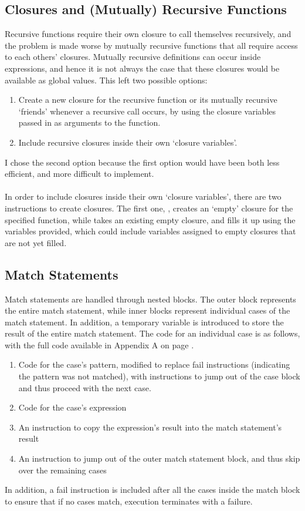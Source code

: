 \subsection{Closures and (Mutually) Recursive Functions}
Recursive functions require their own closure to call themselves recursively, and the problem is made worse by mutually recursive functions that all require access to each others' closures. Mutually recursive definitions can occur inside expressions, and hence it is not always the case that these closures would be available as global values. This left two possible options:
\begin{enumerate}
\item Create a new closure for the recursive function or its mutually recursive `friends' whenever a recursive call occurs, by using the closure variables passed in as arguments to the function.
\item Include recursive closures inside their own `closure variables'.
\end{enumerate}
I chose the second option because the first option would have been both less efficient, and more difficult to implement.
\\\\
In order to include closures inside their own `closure variables', there are two instructions to create closures. The first one, , creates an `empty' closure for the specified function, while  takes an existing empty closure, and fills it up using the variables provided, which could include variables assigned to empty closures that are not yet filled.

\subsection{Match Statements}
Match statements are handled through nested blocks. The outer block represents the entire match statement, while inner blocks represent individual cases of the match statement. In addition, a temporary variable is introduced to store the result of the entire match statement. The code for an individual case is as follows, with the full code available in Appendix A on page \pageref{sample:transformmatch}.
\begin{enumerate}
\item Code for the case's pattern, modified to replace fail instructions (indicating the pattern was not matched), with instructions to jump out of the case block and thus proceed with the next case.
\item Code for the case's expression
\item An instruction to copy the expression's result into the match statement's result
\item An instruction to jump out of the outer match statement block, and thus skip over the remaining cases
\end{enumerate}
In addition, a fail instruction is included after all the cases inside the match block to ensure that if no cases match, execution terminates with a failure.

